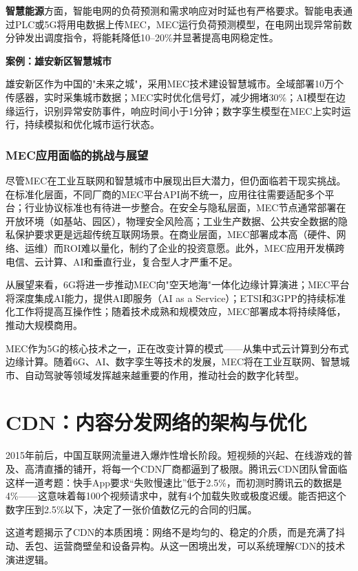 \textbf{智慧能源}方面，智能电网的负荷预测和需求响应对时延也有严格要求。智能电表通过PLC或5G将用电数据上传MEC，MEC运行负荷预测模型，在电网出现异常前数分钟发出调度指令，将能耗降低10--20\%并显著提高电网稳定性。

\textbf{案例：雄安新区智慧城市}

雄安新区作为中国的"未来之城"，采用MEC技术建设智慧城市。全域部署10万个传感器，实时采集城市数据；MEC实时优化信号灯，减少拥堵30\%；AI模型在边缘运行，识别异常安防事件，响应时间小于1分钟；数字孪生模型在MEC上实时运行，持续模拟和优化城市运行状态。

\subsubsection{MEC应用面临的挑战与展望}

尽管MEC在工业互联网和智慧城市中展现出巨大潜力，但仍面临若干现实挑战。在标准化层面，不同厂商的MEC平台API尚不统一，应用往往需要适配多个平台；行业协议标准也有待进一步整合。在安全与隐私层面，MEC节点通常部署在开放环境（如基站、园区），物理安全风险高；工业生产数据、公共安全数据的隐私保护要求更是远超传统互联网场景。在商业层面，MEC部署成本高（硬件、网络、运维）而ROI难以量化，制约了企业的投资意愿。此外，MEC应用开发横跨电信、云计算、AI和垂直行业，复合型人才严重不足。

从展望来看，6G将进一步推动MEC向"空天地海"一体化边缘计算演进；MEC平台将深度集成AI能力，提供AI即服务（AI as a Service）；ETSI和3GPP的持续标准化工作将提高互操作性；随着技术成熟和规模效应，MEC部署成本将持续降低，推动大规模商用。

MEC作为5G的核心技术之一，正在改变计算的模式——从集中式云计算到分布式边缘计算。随着6G、AI、数字孪生等技术的发展，MEC将在工业互联网、智慧城市、自动驾驶等领域发挥越来越重要的作用，推动社会的数字化转型。

\section{CDN：内容分发网络的架构与优化}

2015年前后，中国互联网流量进入爆炸性增长阶段。短视频的兴起、在线游戏的普及、高清直播的铺开，将每一个CDN厂商都逼到了极限。腾讯云CDN团队曾面临这样一道考题：快手App要求``失败慢速比''低于2.5\%，而初测时腾讯云的数据是4\%——这意味着每100个视频请求中，就有4个加载失败或极度迟缓。能否把这个数字压到2.5\%以下，决定了一张价值数亿元的合同的归属。

这道考题揭示了CDN的本质困境：网络不是均匀的、稳定的介质，而是充满了抖动、丢包、运营商壁垒和设备异构。从这一困境出发，可以系统理解CDN的技术演进逻辑。


